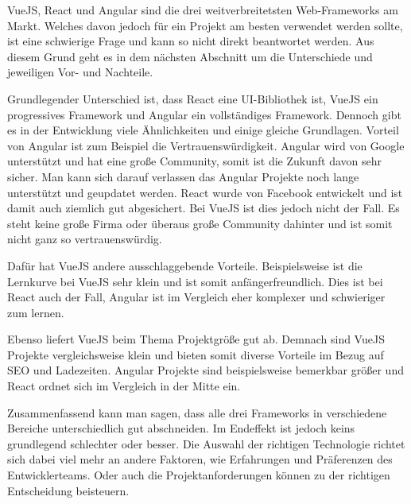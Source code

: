 VueJS, React und Angular sind die drei weitverbreitetsten Web-Frameworks am Markt. Welches davon jedoch für ein Projekt am besten verwendet werden sollte, ist eine schwierige Frage und kann so nicht direkt beantwortet werden. Aus diesem Grund geht es in dem nächsten Abschnitt um die Unterschiede und jeweiligen Vor- und Nachteile.

Grundlegender Unterschied ist, dass React eine UI-Bibliothek ist, VueJS ein progressives Framework und Angular ein vollständiges Framework. Dennoch gibt es in der Entwicklung viele Ähnlichkeiten und einige gleiche Grundlagen.
Vorteil von Angular ist zum Beispiel die Vertrauenswürdigkeit. Angular wird von Google unterstützt und hat eine große Community, somit ist die Zukunft davon sehr sicher. Man kann sich darauf verlassen das Angular Projekte noch lange unterstützt und geupdatet werden. React wurde von Facebook entwickelt und ist damit auch ziemlich gut abgesichert. Bei VueJS ist dies jedoch nicht der Fall. Es steht keine große Firma oder überaus große Community dahinter und ist somit nicht ganz so vertrauenswürdig.

Dafür hat VueJS andere ausschlaggebende Vorteile. Beispielsweise ist die Lernkurve bei VueJS sehr klein und ist somit anfängerfreundlich. Dies ist bei React auch der Fall, Angular ist im Vergleich eher komplexer und schwieriger zum lernen.

Ebenso liefert VueJS beim Thema Projektgröße gut ab. Demnach sind VueJS Projekte vergleichsweise klein und bieten somit diverse Vorteile im Bezug auf SEO und Ladezeiten. Angular Projekte sind beispielsweise bemerkbar größer und React ordnet sich im Vergleich in der Mitte ein.

Zusammenfassend kann man sagen, dass alle drei Frameworks in verschiedene Bereiche unterschiedlich gut abschneiden. Im Endeffekt ist jedoch keins grundlegend schlechter oder besser. Die Auswahl der richtigen Technologie richtet sich dabei viel mehr an andere Faktoren, wie Erfahrungen und Präferenzen des Entwicklerteams. Oder auch die Projektanforderungen können zu der richtigen Entscheidung beisteuern.
\cite{frontend_web_comparison}